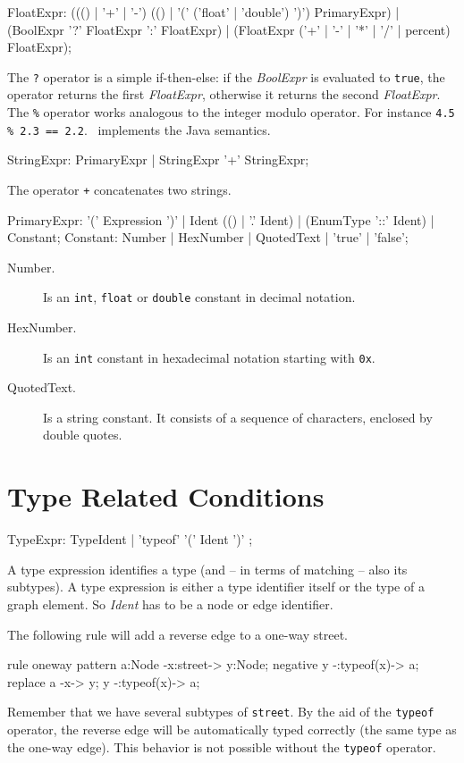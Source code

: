 \begin{rail}  
  FloatExpr: ((() | '+' | '-') (() | '(' ('float' | 'double') ')') PrimaryExpr) | (BoolExpr '?' FloatExpr ':' FloatExpr) | (FloatExpr ('+' | '-' | '*' | '/' | percent) FloatExpr);
\end{rail} 
The \texttt{?} operator is a simple if-then-else: if the \emph{BoolExpr} is evaluated to \texttt{true}, the operator returns the first \emph{FloatExpr}, otherwise it returns the second \emph{FloatExpr}.\\
The \texttt{\%} operator works analogous to the integer modulo operator. For instance \texttt{4.5 \% 2.3 == 2.2}. \GrG\ implements the Java semantics. 

\begin{rail}
  StringExpr: PrimaryExpr | StringExpr '+' StringExpr;
\end{rail}
The operator \texttt{+} concatenates two strings.

\begin{rail} 
  PrimaryExpr: '(' Expression ')' | Ident (() | '.' Ident) | (EnumType '::' Ident) | Constant;
  Constant: Number | HexNumber | QuotedText | 'true' | 'false';
\end{rail}
\begin{description}
  \item[Number.] Is an \texttt{int}, \texttt{float} or \texttt{double} constant in decimal notation.
  \item[HexNumber.] Is an \texttt{int} constant in hexadecimal notation starting with \texttt{0x}.
  \item[QuotedText.] Is a string constant. It consists of a sequence of characters, enclosed by double quotes.
\end{description}

\section{Type Related Conditions}
\label{typeexpressions}

\begin{rail}
  TypeExpr: TypeIdent | 'typeof' '(' Ident ')' ;
\end{rail}
A type expression identifies a type (and -- in terms of matching -- also its subtypes). A type expression is either a type identifier itself or the type of a graph element. So \emph{Ident} has to be a node or edge identifier.
\begin{example}
The following rule will add a reverse edge to a one-way street.
\begin{grgen}
rule oneway {
    pattern {
        a:Node -x:street-> y:Node;
        negative{
            y -:typeof(x)-> a;
        }
    } 
    replace {
      a -x-> y;
      y -:typeof(x)-> a;
    }
}
\end{grgen}
Remember that we have several subtypes of \texttt{street}. By the aid of the \texttt{typeof} operator, the reverse edge will be automatically typed correctly (the same type as the one-way edge). This behavior is not possible without the \texttt{typeof} operator.
\end{example}

